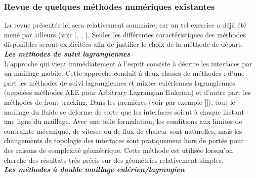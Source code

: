 \subsubsection{Revue de quelques m\'ethodes num\'eriques existantes}
La revue pr\'esent\'ee ici sera relativement sommaire, car un tel exercice a d\'ej\`a \'et\'e men\'e par ailleurs (voir [\cite{Jamet2002}, \cite{Duquennoy2000}, \cite{Lebaigue1998}). Seules les diff\'erentes caract\'eristiques des m\'ethodes disponibles seront explicit\'ees afin de justifier le choix de la m\'ethode de d\'epart.\smallskip \\

\textit{\textbf{Les m\'ethodes de suivi lagrangiennes}}\smallskip \\

L’approche qui vient imm\'ediatement à l’esprit consiste à d\'ecrire les interfaces par un maillage mobile. Cette approche conduit \`a deux classes de m\'ethodes : d’une part les m\'ethodes de suivi lagrangiennes et mixtes eul\'eriennes lagrangiennes (appel\'ees m\'ethodes ALE pour Arbitrary Lagrangian Eulerian) et d’autre part les m\'ethodes de front-tracking. Dans les premi\`eres (voir par exemple [\cite{Maury1996}]), tout le maillage du fluide se d\'eforme de sorte que les interfaces soient \`a chaque instant une ligne du maillage. Avec une telle formulation, les conditions aux limites de contrainte m\'ecanique, de vitesse ou de flux de chaleur sont naturelles, mais les changements de topologie des interfaces sont pratiquement hors de port\'ee pour des raisons de complexit\'e g\'eom\'etrique. Cette m\'ethode est utilis\'ee lorsqu’on cherche des r\'esultats très pr\'ecis sur des g\'eom\'etries relativement simples.\smallskip \\

\textit{\textbf{Les m\'ethodes \`a double maillage eul\'erien/lagrangien}}\smallskip \\


